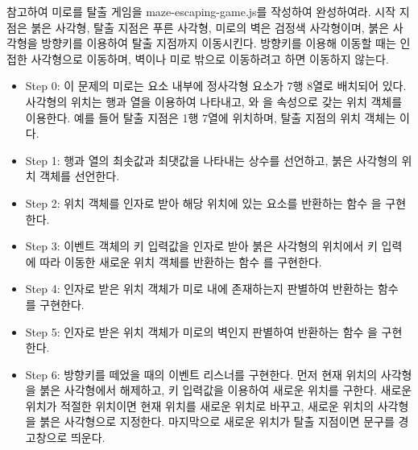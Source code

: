\와 \을 참고하여 미로를 탈출 게임을 maze-escaping-game.js를 작성하여 완성하여라. 시작 지점은 붉은 사각형, 탈출 지점은 푸른 사각형, 미로의 벽은 검정색 사각형이며, 붉은 사각형을 방향키를 이용하여 탈출 지점까지 이동시킨다. 방향키를 이용해 이동할 때는 인접한 사각형으로 이동하며, 벽이나 미로 밖으로 이동하려고 하면 이동하지 않는다.

\begin{itemize}
    \item Step 0: 이 문제의 미로는  요소 내부에 정사각형 요소가 7행 8열로 배치되어 있다. 사각형의 위치는 행과 열을 이용하여 나타내고, 와 을 속성으로 갖는 위치 객체를 이용한다. 예를 들어 탈출 지점은 1행 7열에 위치하며, 탈출 지점의 위치 객체는 이다.
    \item Step 1: 행과 열의 최솟값과 최댓값을 나타내는 상수를 선언하고, 붉은 사각형의 위치 객체를 선언한다.
    \item Step 2: 위치 객체를 인자로 받아 해당 위치에 있는 요소를 반환하는 함수 을 구현한다.
    \item Step 3: 이벤트 객체의 키 입력값을 인자로 받아 붉은 사각형의 위치에서 키 입력에 따라 이동한 새로운 위치 객체를 반환하는 함수 를 구현한다.
    \item Step 4: 인자로 받은 위치 객체가 미로 내에 존재하는지 판별하여 반환하는 함수 를 구현한다.
    \item Step 5: 인자로 받은 위치 객체가 미로의 벽인지 판별하여 반환하는 함수 을 구현한다.
    \item Step 6: 방향키를 떼었을 때의 이벤트 리스너를 구현한다. 먼저 현재 위치의 사각형을 붉은 사각형에서 해제하고, 키 입력값을 이용하여 새로운 위치를 구한다. 새로운 위치가 적절한 위치이면 현재 위치를 새로운 위치로 바꾸고, 새로운 위치의 사각형을 붉은 사각형으로 지정한다. 마지막으로 새로운 위치가 탈출 지점이면  문구를 경고창으로 띄운다.
\end{itemize}
